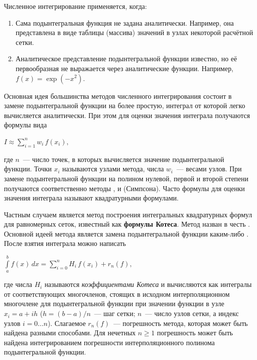 \documentclass[a4paper]{article}
\begin{document}
{{{{{{{{Численное интегрирование применяется, когда:\\

\begin{enumerate}
\item
  Сама подынтегральная функция не задана аналитически. Например, она
  представлена в виде таблицы (массива) значений в узлах некоторой
  расчётной сетки.
\item
  Аналитическое представление подынтегральной функции известно, но её
  первообразная не выражается через аналитические функции. Например,
  {{\(f(x) = \exp( - x^{2})\)}}.
\end{enumerate}


Основная идея большинства методов численного интегрирования состоит в
замене подынтегральной функции на более простую, интеграл от которой
легко вычисляется аналитически. При этом для оценки значения интеграла
получаются формулы вида

\begin{center}
 {{\(I \approx \sum\limits_{i = 1}^{n}w_{i}\, f(x_{i}),\)}}
\end{center}

где {{\(n\)}}~--- число точек, в которых вычисляется значение
подынтегральной функции. Точки {{\(x_{i}\)}} называются узлами метода,
числа {{\(w_{i}\)}}~--- весами узлов. При замене подынтегральной функции
на полином нулевой, первой и второй степени получаются соответственно
методы , и (Симпсона). Часто формулы для оценки значения интеграла
называют квадратурными формулами.

Частным случаем является метод построения интегральных квадратурных
формул для равномерных сеток, известный как \textbf{формулы Котеса}.
Метод назван в честь . Основной идеей метода является замена
подынтегральной функции каким-либо . После взятия интеграла можно
написать

\begin{center}
 {{\(\int\limits_{a}^{b}f(x)\, dx = \sum\limits_{i = 0}^{n}H_{i}\, f(x_{i}) + r_{n}(f),\)}}
\end{center}

где числа {{\(H_{i}\)}} называются \emph{коэффициентами Котеса} и
вычисляются как интегралы от соответствующих многочленов, стоящих в
исходном интерполяционном многочлене для подынтегральной функции при
значении функции в узле {{\(x_{i} = a + ih\)}}
({{\(h = (b - a)/n\)}}~--- шаг сетки; {{\(n\)}}~--- число узлов сетки, а
индекс узлов {{\(i = 0\ldots n\)}}). Слагаемое {{\(r_{n}(f)\)}}~---
погрешность метода, которая может быть найдена разными способами. Для
нечетных {{\(n \geqslant 1\)}} погрешность может быть найдена
интегрированием погрешности интерполяционного полинома подынтегральной
функции.

}}}}}}}}
\end{document}
